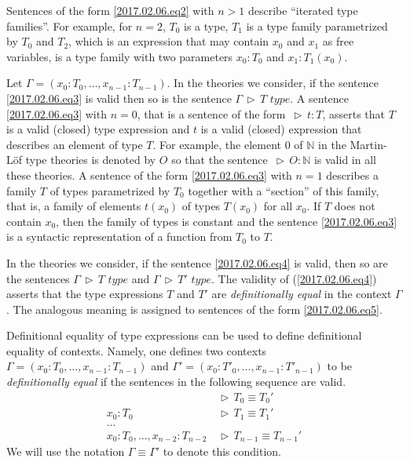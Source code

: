 \documentclass[onecolumn,12pt]{amsart}
\numberwithin{proposition}{subsection}
\newcommand{\nn}{{\mathbb N}}
\newcommand{\nat}{\nn}
\DeclareMathOperator{\rh}{\,\rhd\,}
\newcommand{\type}{\,\,type}
\begin{document}
Sentences of the form \ref{2017.02.06.eq2} with $n>1$ describe ``iterated
type families''. For example, for $n=2$, $T_0$ is a type, $T_1$ is a type
family parametrized by $T_0$ and $T_2$, which is an expression that may contain
$x_0$ and $x_1$ as free variables, is a type family with two parameters
$x_0:T_0$ and $x_1:T_1(x_0)$.

Let $\Gamma=(x_0:T_0,\dots,x_{n-1}:T_{n-1})$.  In the theories we consider, if the sentence
\ref{2017.02.06.eq3} is valid then so is the sentence $\Gamma\rh T\type$.
A sentence \ref{2017.02.06.eq3} with $n=0$, that is a sentence of the form $\rh
t:T$, asserts that $T$ is a valid (closed) type expression and $t$ is a valid
(closed) expression that describes an element of type $T$. For example, the
element $0$ of $\nat$ in the Martin-L\"{o}f type theories is denoted by $O$ so
that the sentence $\rh O:\nat$ is valid in all these theories. A sentence of
the form \ref{2017.02.06.eq3} with $n=1$ describes a family $T$ of types
parametrized by $T_0$ together with a ``section'' of this family, that is, a
family of elements $t(x_0)$ of types $T(x_0)$ for all $x_0$. If $T$ does not
contain $x_0$, then the family of types is constant and the sentence
\ref{2017.02.06.eq3} is a syntactic representation of a function from $T_0$
to $T$.

In the theories we consider, if the sentence \ref{2017.02.06.eq4} is valid, then so are the sentences
$\Gamma\rh T\type$ and $\Gamma\rh T'\type$.  The validity of
(\ref{2017.02.06.eq4}) asserts that the type expressions $T$ and $T'$ are {\em
  definitionally equal} in the context $\Gamma$.  The analogous meaning is
assigned to sentences of the form \ref{2017.02.06.eq5}.

Definitional equality of type expressions can be used to define definitional
equality of contexts. Namely, one defines two contexts
$\Gamma = (x_0:T_0,\dots,x_{n-1}:T_{n-1})$ and $\Gamma' = (x_0:T'_0,\dots,x_{n-1}:T'_{n-1})$ to be
{\em definitionally equal} if the sentences in the following sequence are valid.
%
\begin{equation}\label{2017.04.07.eq1}
  \begin{aligned}
& \rh T_0\equiv T_0'\\
x_0:T_0& \rh T_1\equiv T_1'\\
\dots\\
x_0:T_0,\dots,x_{n-2}:T_{n-2}& \rh T_{n-1}\equiv T_{n-1}'
  \end{aligned}
\end{equation}
%
We will use the notation $\Gamma \equiv \Gamma'$ to denote this condition.
\end{document}
